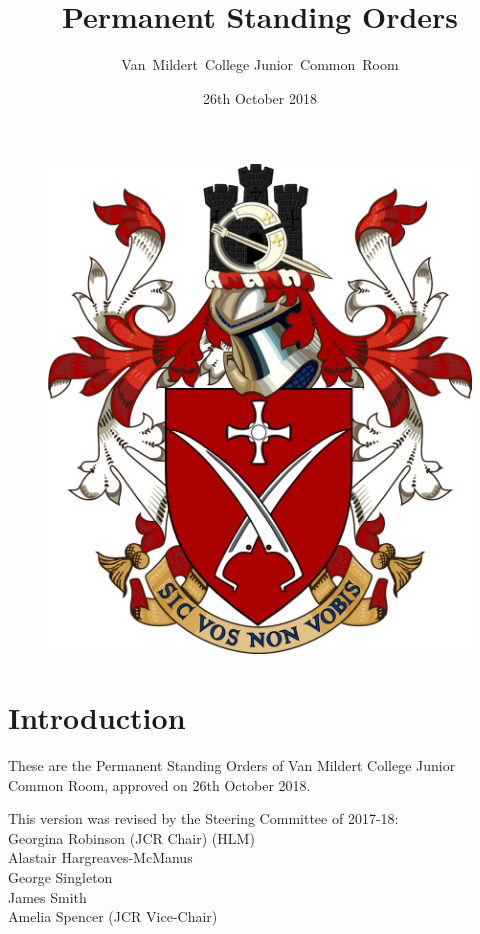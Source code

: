 \documentclass[12pt]{article}  %
\title{Permanent Standing Orders}
\author{Van~Mildert~College Junior~Common~Room}
\date{26th October 2018}
\begin{document}
\begin{titlepage}  %
\maketitle
\begin{figure}[h]
\includegraphics[scale=0.25]{arms}  %
\centering
\end{figure}
\thispagestyle{empty}
\end{titlepage}

\setcounter{page}{2}  %
\section*{Introduction}
These are the Permanent Standing Orders of Van Mildert College Junior Common Room, approved on 26th October 2018.

This version was revised by the Steering Committee of 2017-18:\\
\hspace*{2cm}Georgina Robinson (JCR Chair) (HLM)\\
\hspace*{2cm}Alastair Hargreaves-McManus\\
\hspace*{2cm}George Singleton\\
\hspace*{2cm}James Smith\\
\hspace*{2cm}Amelia Spencer (JCR Vice-Chair)
\end{document}
